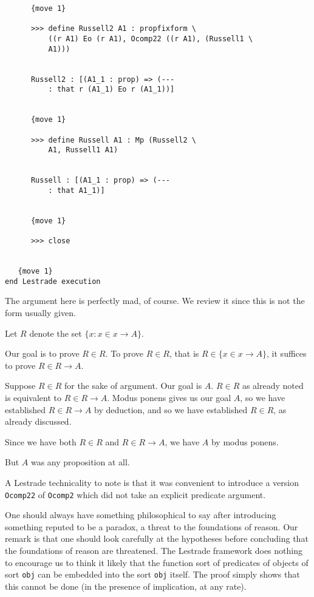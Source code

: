 \documentclass[12pt]{article}
\begin{document}
\begin{verbatim}
      {move 1}

      >>> define Russell2 A1 : propfixform \
          ((r A1) Eo (r A1), Ocomp22 ((r A1), (Russell1 \
          A1)))


      Russell2 : [(A1_1 : prop) => (--- 
          : that r (A1_1) Eo r (A1_1))]


      {move 1}

      >>> define Russell A1 : Mp (Russell2 \
          A1, Russell1 A1)


      Russell : [(A1_1 : prop) => (--- 
          : that A1_1)]


      {move 1}

      >>> close


   {move 1}
end Lestrade execution
\end{verbatim}



The argument here is perfectly mad, of course.  We review it since this is not the form usually given.

Let $R$ denote the set $\{x:x \in x \rightarrow A\}$.

Our goal is to prove $R \in R$.  To prove $R \in R$, that is $R \in \{x \in x \rightarrow A\}$, it suffices to prove $R \in R \rightarrow A$.

Suppose $R \in R$ for the sake of argument.  Our goal is $A$.  $R \in R$ as already noted is equivalent to $R \in R \rightarrow A$.
Modus ponens gives us our goal $A$, so we have established $R \in R \rightarrow A$ by deduction, and so we have established $R \in R$,
as already discussed.

Since we have both $R \in R$ and $R \in R \rightarrow A$, we have $A$ by modus ponens.

But $A$ was any proposition at all.

A Lestrade technicality to note is that it was convenient to introduce a version {\tt Ocomp22} of {\tt Ocomp2}  which did not take an explicit predicate argument.

One should always have something philosophical to say after introducing something reputed to be a paradox, a threat to the foundations of reason.  Our remark is that one should look carefully at the hypotheses before concluding that the foundations of reason are threatened.  The Lestrade framework does nothing to encourage us to think it likely that the function sort of predicates of objects of sort {\tt obj} can be embedded into the sort {\tt obj} itself.  The proof simply shows that this cannot be done (in the presence of implication, at any rate).
\end{document}
